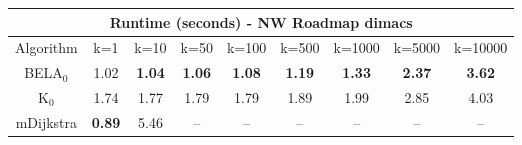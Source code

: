 \begin{tabular}{c|cccccccc}\toprule
\multicolumn{9}{c}{Runtime (seconds) - NW Roadmap dimacs}\\ \midrule
Algorithm & k=1 & k=10 & k=50 & k=100 & k=500 & k=1000 & k=5000 & k=10000 \\ \midrule
BELA$_0$ & 1.02 & \textbf{1.04} & \textbf{1.06} & \textbf{1.08} & \textbf{1.19} & \textbf{1.33} & \textbf{2.37} & \textbf{3.62} \\
K$_0$ & 1.74 & 1.77 & 1.79 & 1.79 & 1.89 & 1.99 & 2.85 & 4.03 \\
mDijkstra & \textbf{0.89} & 5.46 & -- & -- & -- & -- & -- & -- \\ \bottomrule 
\end{tabular}
